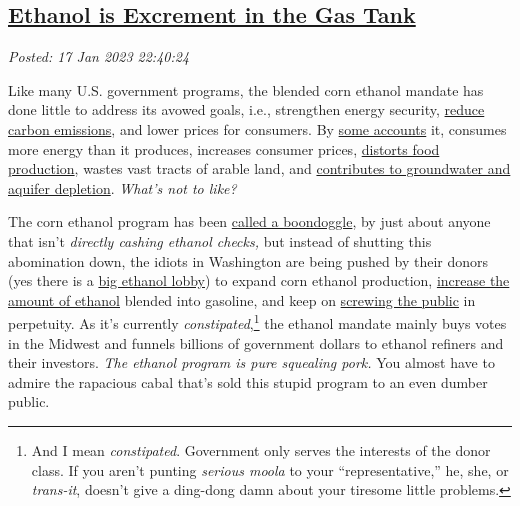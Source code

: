 %

\subsection*{\href{https://analyzethedatanotthedrivel.org/2023/01/17/ethanol-is-excrement-in-the-gas-tank/}{Ethanol is Excrement in the Gas Tank}}


\noindent\emph{Posted: 17 Jan 2023 22:40:24}
\vspace{6pt}


Like many U.S. government programs, the blended corn ethanol mandate has
done little to address its avowed goals, i.e., strengthen energy
security,
\href{https://www.factcheck.org/2015/11/ethanol-higher-emissions-or-lower/}{reduce
carbon emissions}, and lower prices for consumers. By
\href{http://large.stanford.edu/courses/2011/ph240/sojka2/}{some
accounts} it, consumes more energy than it produces, increases consumer
prices,
\href{https://www.ucsusa.org/resources/land-use-changes-and-biofuels}{distorts
food production}, wastes vast tracts of arable land, and
\href{https://news.climate.columbia.edu/2011/03/21/ethanol\%E2\%80\%99s-impacts-on-our-water-resources/}{contributes
to groundwater and aquifer depletion}. \emph{What's not to like?}

The corn ethanol program has been
\href{https://the-pipeline.org/the-great-ethanol-boondoggle/}{called a
boondoggle}, by just about anyone that isn't \emph{directly cashing
ethanol checks,} but instead of shutting this abomination down, the
idiots in Washington are being pushed by their donors (yes there is a
\href{https://www.bloomberg.com/news/articles/2021-11-16/ethanol-lobby-to-white-house-blend-rule-rollback-would-backfire\#xj4y7vzkg}{big
ethanol lobby}) to expand corn ethanol production,
\href{https://www.popularmechanics.com/cars/hybrid-electric/a11687/four-things-to-know-about-e15-15096134/}{increase
the amount of ethanol} blended into gasoline, and keep on \href{https://www.forbes.com/sites/dianafurchtgott-roth/2022/12/02/higher-ethanol-mandates-are-a-lose-lose-for-americans/?sh=331fc2e05c8d}{screwing the public} in perpetuity. As it's currently \emph{constipated},\footnote{And
  I mean \emph{constipated}. Government only serves the interests of the
  donor class. If you aren't punting \emph{serious moola} to your
  ``representative,'' he, she, or \emph{trans-it}, doesn't give a
  ding-dong damn about your tiresome little problems.} the ethanol
mandate mainly buys votes in the Midwest and funnels billions of
government dollars to ethanol refiners and their investors. \emph{The
ethanol program is pure squealing pork.} You almost have to admire
the rapacious cabal that's sold this stupid program to an even dumber
public.

